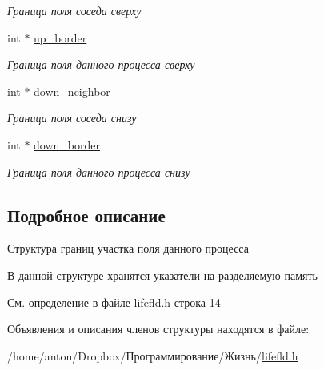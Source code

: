 \begin{DoxyCompactItemize}
\begin{DoxyCompactList}\small\item\em Граница поля соседа сверху \end{DoxyCompactList}\item 
int $\ast$ \hyperlink{structborder_aa03d07abcb95934a80f3a5216a437e05}{up\+\_\+border}\hypertarget{structborder_aa03d07abcb95934a80f3a5216a437e05}{}\label{structborder_aa03d07abcb95934a80f3a5216a437e05}

\begin{DoxyCompactList}\small\item\em Граница поля данного процесса сверху \end{DoxyCompactList}\item 
int $\ast$ \hyperlink{structborder_af38f8c295590a5b07d90ccf4b246692b}{down\+\_\+neighbor}\hypertarget{structborder_af38f8c295590a5b07d90ccf4b246692b}{}\label{structborder_af38f8c295590a5b07d90ccf4b246692b}

\begin{DoxyCompactList}\small\item\em Граница поля соседа снизу \end{DoxyCompactList}\item 
int $\ast$ \hyperlink{structborder_a91c057e02d53238e157ee6e67f694177}{down\+\_\+border}\hypertarget{structborder_a91c057e02d53238e157ee6e67f694177}{}\label{structborder_a91c057e02d53238e157ee6e67f694177}

\begin{DoxyCompactList}\small\item\em Граница поля данного процесса снизу \end{DoxyCompactList}\end{DoxyCompactItemize}


\subsection{Подробное описание}
Структура границ участка поля данного процесса 

В данной структуре хранятся указатели на разделяемую память 

См. определение в файле lifefld.\+h строка 14



Объявления и описания членов структуры находятся в файле\+:\begin{DoxyCompactItemize}
\item 
/home/anton/\+Dropbox/Программирование/Жизнь/\hyperlink{lifefld_8h}{lifefld.\+h}\end{DoxyCompactItemize}
